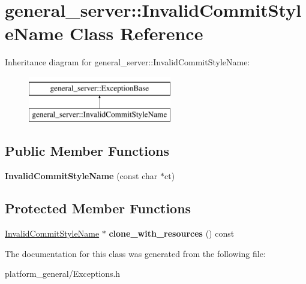 \hypertarget{classgeneral__server_1_1InvalidCommitStyleName}{\section{general\-\_\-server\-:\-:\-Invalid\-Commit\-Style\-Name \-Class \-Reference}
\label{classgeneral__server_1_1InvalidCommitStyleName}
}
\-Inheritance diagram for general\-\_\-server\-:\-:\-Invalid\-Commit\-Style\-Name\-:\begin{figure}[H]
\begin{center}
\leavevmode
\includegraphics[height=2.000000cm]{classgeneral__server_1_1InvalidCommitStyleName}
\end{center}
\end{figure}
\subsection*{\-Public \-Member \-Functions}
\begin{DoxyCompactItemize}
\item 
\hypertarget{classgeneral__server_1_1InvalidCommitStyleName_a78a215882c92736b34ec9aeed64719df}{{\bfseries \-Invalid\-Commit\-Style\-Name} (const char $\ast$ct)}\label{classgeneral__server_1_1InvalidCommitStyleName_a78a215882c92736b34ec9aeed64719df}

\end{DoxyCompactItemize}
\subsection*{\-Protected \-Member \-Functions}
\begin{DoxyCompactItemize}
\item 
\hypertarget{classgeneral__server_1_1InvalidCommitStyleName_aca0d06d3e1dd65147b64bf8610df89c0}{\hyperlink{classgeneral__server_1_1InvalidCommitStyleName}{\-Invalid\-Commit\-Style\-Name} $\ast$ {\bfseries clone\-\_\-with\-\_\-resources} () const }\label{classgeneral__server_1_1InvalidCommitStyleName_aca0d06d3e1dd65147b64bf8610df89c0}

\end{DoxyCompactItemize}


\-The documentation for this class was generated from the following file\-:\begin{DoxyCompactItemize}
\item 
platform\-\_\-general/\-Exceptions.\-h\end{DoxyCompactItemize}
